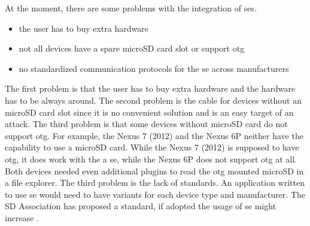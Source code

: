 At the moment, there are some problems with the integration of \gls{se}s.
\begin{itemize}
  \item the user has to buy extra hardware
  \item not all devices have a spare microSD card slot or support \gls{otg}
  \item no standardized communication protocols for the \gls{se} across manufacturers
\end{itemize}
The first problem is that the user has to buy extra hardware and the hardware has to be always around.
The second problem is the cable for devices without an microSD card slot since it is no convenient solution and is an easy target of an attack.
\newline
The third problem is that some devices without microSD card do not support \gls{otg}.
For example, the Nexus 7 (2012) and the Nexus 6P neither have the capability to use a microSD card.
While the Nexus 7 (2012) is supposed to have \gls{otg}, it does work with the a \gls{se}, while the Nexus 6P does not support \gls{otg} at all.
Both devices needed even additional plugins to read the \gls{otg} mounted microSD in a file explorer.
The third problem is the lack of standards.
An application written to use \gls{se} would need to have variants for each device type and manufacturer.
The SD Association has proposed a standard, if adopted the usage of \gls{se} might increase \cite{smartSD}.
